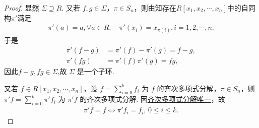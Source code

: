 \documentclass[../../main.tex]{subfiles}%
\begin{document}
\begin{proof}

显然 \( \Sigma \supseteq R \). 又若 \( f, g \in \Sigma \)，\( \pi \in S_n \)，则由知存在$R[x_1,x_2,\cdots,x_n]$中的自同构$\pi'$满足
\begin{align*}
\pi'(a) = a, \forall a \in R, \quad \pi'(x_i) = x_{\pi(i)}, i = 1, 2, \cdots, n.
\end{align*}
于是
\begin{align*}
\pi'(f - g) &= \pi'(f) - \pi'(g) = f - g, \\
\pi'(fg) &= \pi'(f)\pi'(g) = fg,
\end{align*}
因此$f-g,fg\in \Sigma$,故 \( \Sigma \) 是一个子环.

又若 \( f \in R[x_1, x_2, \cdots, x_n] \)，设 \( f = \sum_{i=0}^k f_i \) 为 \( f \) 的齐次多项式分解，\( \pi \in S_n \)，则 \( \pi' f = \sum_{i=0}^k \pi' f_i \) 为 \( \pi' f \) 的齐次多项式分解. 因\hyperref[theorem:多项式的齐次分解]{齐次多项式分解唯一}，故
\begin{align*}
\pi' f = f \iff \pi' f_i = f_i, \, 0 \leqslant i \leqslant k.
\end{align*}

\end{proof}
\end{document}

